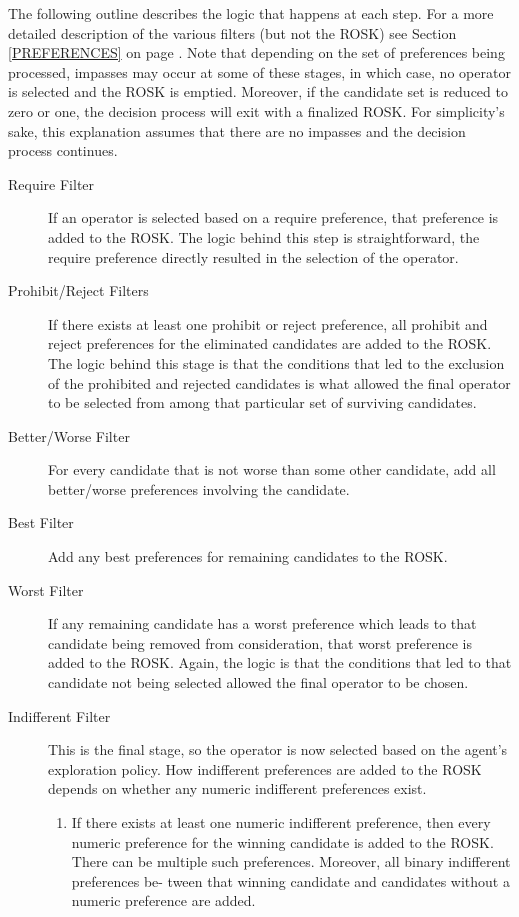 The following outline describes the logic that happens at each step. For a more detailed description of the various filters (but not the ROSK) see Section \ref{PREFERENCES} on page \pageref{PREFERENCES}. Note that depending on the set of preferences being processed, impasses may occur at some of these stages, in which case, no operator is selected and the ROSK is emptied. Moreover, if the candidate set is reduced to zero or one, the decision process will exit with a finalized ROSK. For simplicity's sake, this explanation assumes that there are no impasses and the decision process continues.

\begin{description}
	\item [Require Filter] 
	If an operator is selected based on a require preference, that preference is added to the ROSK. The logic behind this step is straightforward, the require preference directly resulted in the selection of the operator.
	\item [Prohibit/Reject Filters]
	If there exists at least one prohibit or reject preference, all prohibit and reject preferences for the eliminated candidates are added to the ROSK. The logic behind this stage is that the conditions that led to the exclusion of the prohibited and rejected candidates is what allowed the final operator to be selected from among that particular set of surviving candidates.
	\item [Better/Worse Filter]
	For every candidate that is not worse than some other candidate, add all better/worse preferences involving the candidate.
	\item [Best Filter]
	Add any best preferences for remaining candidates to the ROSK.
	\item [Worst Filter]
	If any remaining candidate has a worst preference which leads to that candidate being removed from consideration, that worst preference is added to the ROSK. Again, the logic is that the conditions that led to that candidate not being selected allowed the final operator to be chosen.
	\item [Indifferent Filter]
	This is the final stage, so the operator is now selected based on the agent's exploration policy. How indifferent preferences are added to the ROSK depends on whether any numeric indifferent preferences exist.
	\begin{enumerate}
		\item If there exists at least one numeric indifferent preference, then every numeric preference for the winning candidate is added to the ROSK. There can be multiple such preferences. Moreover, all binary indifferent preferences be- tween that winning candidate and candidates without a numeric preference are added.

\end{enumerate}
\end{description}
